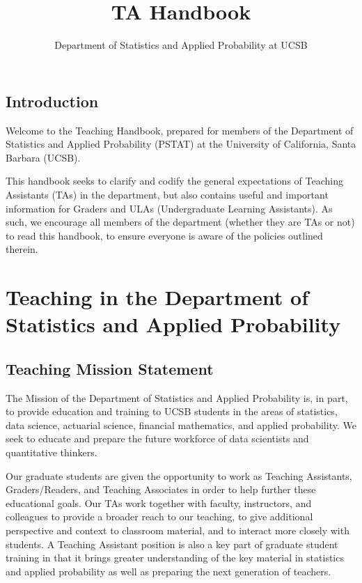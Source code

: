 \documentclass[
  letterpaper,
  DIV=11,
  numbers=noendperiod]{scrreprt}
\title{TA Handbook}
\author{Department of Statistics and Applied Probability at UCSB}
\date{}
\renewcommand*\contentsname{Table of contents}
\newcommand\contentsname{Table of contents}
\begin{document}
\maketitle
\ifdefined\Shaded\renewenvironment{Shaded}{\begin{tcolorbox}[sharp corners, boxrule=0pt, breakable, interior hidden, frame hidden, borderline west={3pt}{0pt}{shadecolor}, enhanced]}{\end{tcolorbox}}\fi

\renewcommand*\contentsname{Table of contents}
{
\hypersetup{linkcolor=}
\setcounter{tocdepth}{2}
\tableofcontents
}

\hypertarget{introduction}{%
\chapter{Introduction}\label{introduction}}

Welcome to the Teaching Handbook, prepared for members of the Department
of Statistics and Applied Probability (PSTAT) at the University of
California, Santa Barbara (UCSB).

This handbook seeks to clarify and codify the general expectations of
Teaching Assistants (TAs) in the department, but also contains useful
and important information for Graders and ULAs (Undergraduate Learning
Assistants). As such, we encourage all members of the department
(whether they are TAs or not) to read this handbook, to ensure everyone
is aware of the policies outlined therein.

\part{\textbf{Teaching in the Department of Statistics and Applied
Probability}}

\hypertarget{teaching-mission-statement}{%
\chapter{Teaching Mission Statement}\label{teaching-mission-statement}}

The Mission of the Department of Statistics and Applied Probability is,
in part, to provide education and training to UCSB students in the areas
of statistics, data science, actuarial science, financial mathematics,
and applied probability. We seek to educate and prepare the future
workforce of data scientists and quantitative thinkers.

Our graduate students are given the opportunity to work as Teaching
Assistants, Graders/Readers, and Teaching Associates in order to help
further these educational goals. Our TAs work together with faculty,
instructors, and colleagues to provide a broader reach to our teaching,
to give additional perspective and context to classroom material, and to
interact more closely with students. A Teaching Assistant position is
also a key part of graduate student training in that it brings greater
understanding of the key material in statistics and applied probability
as well as preparing the next generation of teachers.
\end{document}
